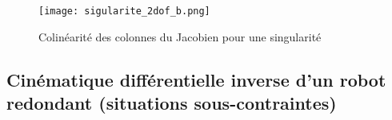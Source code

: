 \begin{figure}[htbp]
	\centering
	\texttt{[image: sigularite\_2dof\_b.png]}
	\caption{Colinéarité des colonnes du Jacobien pour une singularité}
	\label{fig:sigularite_2dof_b}
\end{figure}


\subsection{Cinématique différentielle inverse d'un robot redondant (situations sous-contraintes)}
\label{sec:invdiffkinredondant}

